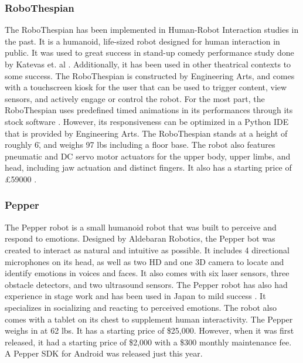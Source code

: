 \subsubsection{RoboThespian}
The RoboThespian has been implemented in Human-Robot Interaction studies in the past.
It is a humanoid, life-sized robot designed for human interaction in public.
It was used to great success in stand-up comedy performance study done by Katevas et. al \cite{KatevasRobot:2014}.
Additionally, it has been used in other theatrical contexts \cite{Spillikin} to some success.
The RoboThespian is constructed by Engineering Arts, and comes with a touchscreen kiosk for the user that can be used to trigger content, view sensors, and actively engage or control the robot.
For the most part, the RoboThespian uses predefined timed animations in its performances through its stock software \cite{KatevasRobot:2014}.
However, its responsiveness can be optimized in a Python IDE that is provided by Engineering Arts.
The RoboThespian stands at a height of roughly 6\", and weighs 97 lbs including a floor base.
The robot also features pneumatic and DC servo motor actuators for the upper body, upper limbs, and head, including jaw actuation and distinct fingers.
It also has a starting price of \pounds59000 \cite{EngineeredArts}.


\subsubsection{Pepper}
The Pepper robot is a small humanoid robot that was built to perceive and respond to emotions.
Designed by Aldebaran Robotics, the Pepper bot was created to interact as natural and intuitive as possible.
It includes 4 directional microphones on its head, as well as two HD and one 3D camera to locate and identify emotions in voices and faces.
It also comes with six laser sensors, three obstacle detectors, and two ultrasound sensors.
The Pepper robot has also had experience in stage work and has been used in Japan to mild success \cite{PepperVid}.
It specializes in socializing and reacting to perceived emotions.
The robot also comes with a tablet on its chest to supplement human interactivity.
The Pepper weighs in at 62 lbs.
It has a starting price of \$25,000. However, when it was first released, it had a starting price of \$2,000 with a \$300 monthly maintenance fee.
A Pepper SDK for Android was released just this year. \cite{PepperBot}


